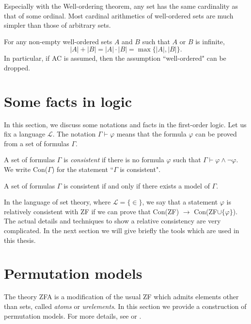 Especially with the Well-ordering theorem, any set has the same cardinality as that of some ordinal. Most cardinal arithmetics of well-ordered sets are much simpler than those of arbitrary sets. 

\begin{theorem}
    For any non-empty well-ordered sets $A$ and $B$ such that $A$ or $B$ is infinite,$$|A|+|B|=|A|\cdot|B|=\max\{|A|,|B|\}.$$ In particular, if AC is assumed, then the assumption ``well-ordered" can be dropped.
\end{theorem}




\section{Some facts in logic}

In this section, we discuss some notations and facts in the first-order logic. Let us fix a language $\mathcal{L}$. The notation $\Gamma\vdash \varphi$ means that the formula $\varphi$ can be proved from a set of formulas $\Gamma$. 

\begin{definition}\textup{
A set of formulas $\Gamma$ is \emph{consistent} if there is no formula $\varphi$ such that $\Gamma\vdash\varphi\land\lnot\varphi$. We write \textup{Con($\Gamma$)}} for the statement ``$\Gamma$ is consistent".
\end{definition}

\begin{theorem}
    A set of formulas $\Gamma$ is consistent if and only if there exists a model of $\Gamma$.
\end{theorem}

In the language of set theory, where $\mathcal{L}=\{\in\}$, we say that a statement $\varphi$ is relatively consistent with ZF if we can prove that Con(ZF) $\to$ Con(ZF$\cup\{\varphi\}$). The actual details and techniques to show a relative consistency are very complicated. In the next section we will give briefly the tools which are used in this thesis.

\section{Permutation models}

The theory ZFA is a modification of the usual ZF which admits elements other than sets, called \emph{atoms} or \emph{urelements}. In this section we provide a construction of permutation models. For more details, see \cite[Chapter 4]{Jech} or \cite[Chapter 8]{Hal}.


